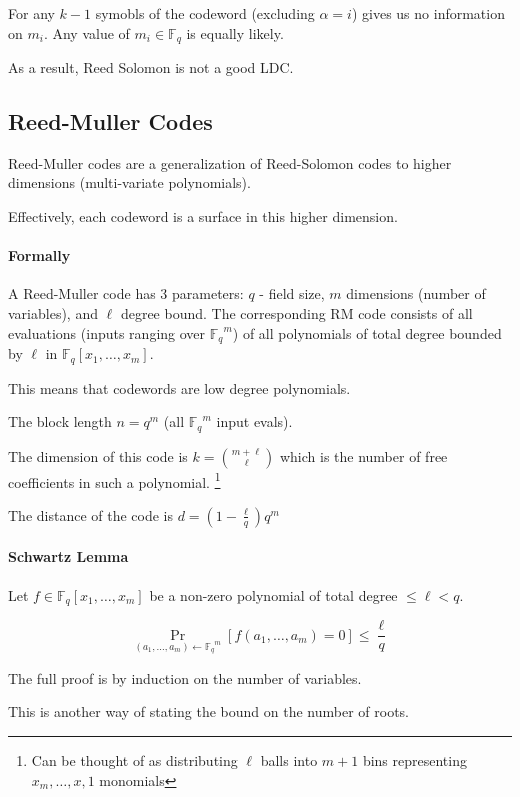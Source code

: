 \documentclass{idc_msc}
\newcommand{\Fq}[1][q]{{\mathbb{F}_{#1}}}
\begin{document}
For any \(k-1\) symobls of the codeword (excluding \(\alpha=i\)) gives us no information on \(m_i\).
Any value of \(m_i \in \Fq\) is equally likely.

As a result, Reed Solomon is not a good LDC.

\subsection{Reed-Muller Codes}

Reed-Muller codes are a generalization of Reed-Solomon codes to higher dimensions (multi-variate polynomials).

Effectively, each codeword is a surface in this higher dimension.

\paragraph{Formally}

A Reed-Muller code has 3 parameters: \(q\) - field size, \(m\) dimensions (number of variables), and \(\ell\) degree bound.
The corresponding RM code consists of all evaluations (inputs ranging over \(\Fq^m\)) of all polynomials of total degree bounded by \(\ell\) in \(\Fq[q][x_1,\ldots,x_m]\).

This means that codewords are low degree polynomials.

The block length \(n = q^m\) (all \(\Fq^m\) input evals).

The dimension of this code is \(k = \binom{m+\ell}{\ell}\) which is the number of free coefficients in such a polynomial.
\footnote{Can be thought of as distributing \(\ell\) balls into \(m+1\) bins representing \(x_m,\ldots,x,1\) monomials}

The distance of the code is \(d = \left(1 - \frac{\ell}{q}\right) q^m\)

\paragraph{Schwartz Lemma}

Let \(f \in \Fq[q][x_1, \ldots, x_m]\) be a non-zero polynomial of total degree \(\le \ell < q\).

\[
  \Pr_{(a_1,\ldots,a_m) \gets \Fq^m} [f(a_1,\ldots,a_m) = 0] \le \frac{\ell}{q}
\]

The full proof is by induction on the number of variables.

This is another way of stating the bound on the number of roots.
\end{document}
